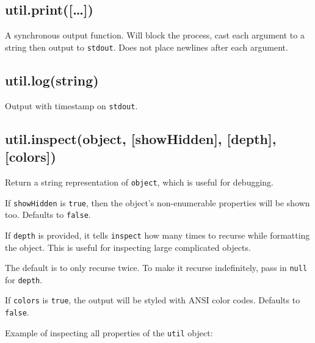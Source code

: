 \subsection{util.print({[}\ldots{}{]})}

A synchronous output function. Will block the process, cast each
argument to a string then output to \texttt{stdout}. Does not place
newlines after each argument.

\subsection{util.log(string)}

Output with timestamp on \texttt{stdout}.

\begin{Shaded}
\begin{Highlighting}[]
\NormalTok{(}\NormalTok{);}
\end{Highlighting}
\end{Shaded}

\subsection{util.inspect(object, {[}showHidden{]}, {[}depth{]},
{[}colors{]})}

Return a string representation of \texttt{object}, which is useful for
debugging.

If \texttt{showHidden} is \texttt{true}, then the object's
non-enumerable properties will be shown too. Defaults to \texttt{false}.

If \texttt{depth} is provided, it tells \texttt{inspect} how many times
to recurse while formatting the object. This is useful for inspecting
large complicated objects.

The default is to only recurse twice. To make it recurse indefinitely,
pass in \texttt{null} for \texttt{depth}.

If \texttt{colors} is \texttt{true}, the output will be styled with ANSI
color codes. Defaults to \texttt{false}.

Example of inspecting all properties of the \texttt{util} object:

\begin{Shaded}
\begin{Highlighting}[]
 \NormalTok{);}

\NormalTok{(}
\end{Highlighting}
\end{Shaded}

